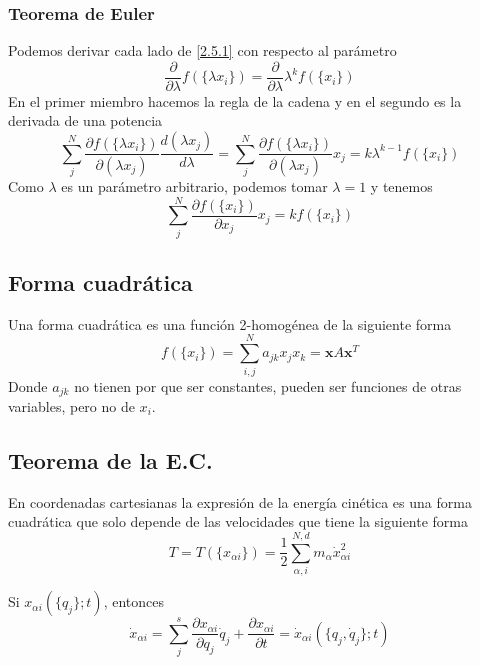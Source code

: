 \subsubsection{Teorema de Euler}
Podemos derivar cada lado de \eqref{2.5.1} con respecto al parámetro
\[\frac{\partial}{\partial \lambda} f(\{\lambda x_i\})= \frac{\partial}{\partial \lambda} \lambda^k f(\{x_i\})\]
En el primer miembro hacemos la regla de la cadena y en el segundo es la derivada de una potencia
\[\sum_j^N \frac{\partial f(\{\lambda x_i\})}{\partial (\lambda x_j)} \frac{d (\lambda x_j)}{d \lambda}= \sum_j^N \frac{\partial f(\{\lambda x_i\})}{\partial (\lambda x_j)} x_j=  k \lambda^{k-1} f(\{x_i\})\]
Como $\lambda$ es un parámetro arbitrario, podemos tomar $\lambda=1$ y tenemos
\begin{equation} \label{2.5.2}
    \sum_j^N \frac{\partial f(\{x_i\})}{\partial x_j} x_j=  k f(\{x_i\})
\end{equation} 
\vspace{-30pt}
\subsection{Forma cuadrática}
Una forma cuadrática es una función 2-homogénea de la siguiente forma
\begin{equation} \label{2.5.3}
    f(\{x_i\})=\sum_{i,j}^N{{a_{jk} x_j x_k}}=\mathbf{x} A \mathbf{x}^T
\end{equation} 
Donde $a_{jk}$ no tienen por que ser constantes, pueden ser funciones de otras variables, pero no de $x_i$.
\subsection{Teorema de la E.C.}
En coordenadas cartesianas la expresión de la energía cinética es una forma cuadrática que solo depende de las velocidades que tiene la siguiente forma
\vspace{-12pt}
\begin{equation} \label{2.5.4}
    T=T(\{x_{\alpha i}\})=\frac{1}{2} \sum_{\alpha, i}^{N,d} m_\alpha \dot{x}_{\alpha i}^2
\end{equation} 

\vspace{-25pt}
Si $x_{\alpha i}(\{q_j\};t)$, entonces
\vspace{-12pt}
\begin{equation} \label{2.5.5}
    \dot{x}_{\alpha i}=\sum_j^s \frac{\partial x_{\alpha i}}{\partial q_j}\dot{q}_j + \frac{\partial x_{\alpha i}}{\partial t}=\dot{x}_{\alpha i}(\{q_j,\dot{q}_j\};t)
\end{equation} 

